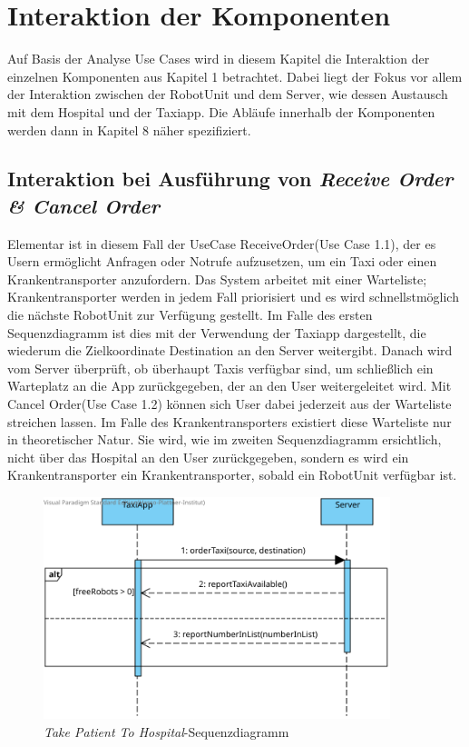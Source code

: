 \section{Interaktion der Komponenten}
Auf Basis der Analyse Use Cases wird in diesem Kapitel die Interaktion der einzelnen Komponenten aus Kapitel 1 betrachtet. 
Dabei liegt der Fokus vor allem der Interaktion zwischen der RobotUnit und dem Server, wie dessen Austausch mit dem Hospital und der Taxiapp. 
Die Abläufe innerhalb der Komponenten werden dann in Kapitel 8 näher spezifiziert. \\


\subsection*{Interaktion bei Ausführung von \emph{Receive Order \& Cancel Order}}

Elementar ist in diesem Fall der UseCase ReceiveOrder(Use Case 1.1), der es Usern ermöglicht Anfragen oder Notrufe aufzusetzen, um ein Taxi oder einen Krankentransporter anzufordern. 
Das System arbeitet mit einer Warteliste; Krankentransporter werden in jedem Fall priorisiert und es wird schnellstmöglich die nächste RobotUnit zur Verfügung gestellt. 
Im Falle des ersten Sequenzdiagramm ist dies mit der Verwendung der Taxiapp dargestellt, die wiederum die Zielkoordinate Destination an den Server weitergibt. 
Danach wird vom Server überprüft, ob überhaupt Taxis verfügbar sind, um schließlich ein Warteplatz an die App zurückgegeben, der an den User weitergeleitet wird. 
Mit Cancel Order(Use Case 1.2) können sich User dabei jederzeit aus der Warteliste streichen lassen. 
Im Falle des Krankentransporters existiert diese Warteliste nur in theoretischer Natur. 
Sie wird, wie im zweiten Sequenzdiagramm ersichtlich, nicht über das Hospital an den User zurückgegeben, sondern es wird ein Krankentransporter ein Krankentransporter, sobald ein RobotUnit verfügbar ist. \\

\begin{figure}[H]
	\centering
	\includegraphics[width=0.9\textwidth]{img/2-Entwurf-RecieveOrder-Taxi.svg}
	\caption{\emph{Take Patient To Hospital}-Sequenzdiagramm}
	\label{SequenzDiagrammInteraktion}
\end{figure}

